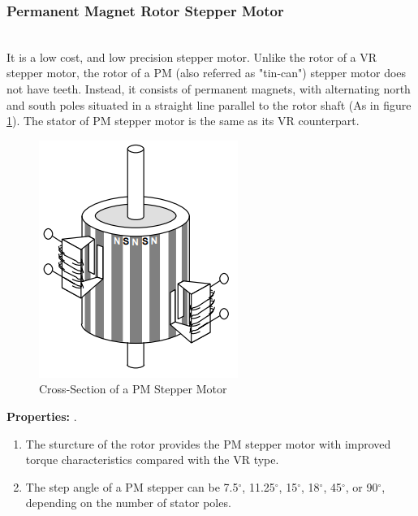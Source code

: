 \documentclass[journal]{IEEEtran}
\begin{document}
\subsubsection{Permanent Magnet Rotor Stepper Motor}\hfill\\
It is a low cost, and low precision stepper motor.   
Unlike the rotor of a VR stepper motor, the rotor of a PM (also referred as "tin-can") stepper motor does not have teeth. Instead, it consists of permanent magnets, with alternating north and south poles situated in a straight line parallel to the rotor shaft (As in figure \ref{pmS}). The stator of PM stepper motor is the same as its VR counterpart. \cite{guru2007} \cite{stepperNotes} \\

\begin{figure}[h]
    \centering
    \includegraphics[scale=0.7]{Stepper/pmStep.png}
    \caption{Cross-Section of a PM Stepper Motor}
    \label{pmS}
\end{figure}



\textbf{Properties:}\cite{chapman2005} \cite{stepperNotes}. \\
\begin{enumerate}
    \item The sturcture of the rotor provides the PM stepper motor with improved torque characteristics compared with the VR type.
    \item The step angle of a PM stepper can be 7.5$^{\circ}$, 11.25$^{\circ}$, 15$^{\circ}$, 18$^{\circ}$, 45$^{\circ}$, or 90$^{\circ}$, depending on the number of stator poles.
    
\end{enumerate}
\end{document}
